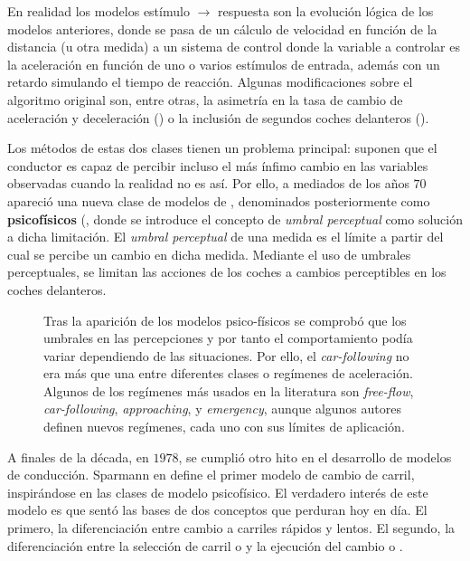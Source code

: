 En realidad los modelos estímulo $\rightarrow$ respuesta son la evolución lógica de los modelos anteriores, donde se pasa de un cálculo de velocidad en función de la distancia (u otra medida) a un sistema de control donde la variable a controlar es la aceleración en función de uno o varios estímulos de entrada, además con un retardo simulando el tiempo de reacción. Algunas modificaciones sobre el algoritmo original son, entre otras, la asimetría en la tasa de cambio de aceleración y deceleración (\cite{Gazis1959}) o la inclusión de segundos coches delanteros (\cite{Bexelius1968}).

Los métodos de estas dos clases tienen un problema principal: suponen que el conductor es capaz de percibir incluso el más ínfimo cambio en las variables observadas cuando la realidad no es así. Por ello, a mediados de los años $70$ apareció una nueva clase de modelos de \textit{}, denominados posteriormente como \textbf{psicofísicos} (\cite{wiedemann1974simulation}, donde se introduce el concepto de \textit{umbral perceptual} como solución a dicha limitación. El \textit{umbral perceptual} de una medida es el límite a partir del cual se percibe un cambio en dicha medida. Mediante el uso de umbrales perceptuales, se limitan las acciones de los coches a cambios perceptibles en los coches delanteros.

\begin{figure}
	\centering
	\caption{Tras la aparición de los modelos psico-físicos se comprobó que los umbrales en las percepciones y por tanto el comportamiento podía variar dependiendo de las situaciones. Por ello, el \textit{car-following} no era más que una entre diferentes clases o regímenes de aceleración. Algunos de los regímenes más usados en la literatura son \textit{free-flow}, \textit{car-following}, \textit{approaching}, y \textit{emergency}, aunque algunos autores definen nuevos regímenes, cada uno con sus límites de aplicación.}
	\label{fig:acceleration-model-classes}
\end{figure}

A finales de la década, en $1978$, se cumplió otro hito en el desarrollo de modelos de conducción. Sparmann en \cite{Sparmann1978} define el primer modelo de cambio de carril, inspirándose en las clases de modelo psicofísico. El verdadero interés de este modelo es que sentó las bases de dos conceptos que perduran hoy en día. El primero, la diferenciación entre cambio a carriles rápidos y lentos. El segundo, la diferenciación entre la selección de carril o \textit{} y la ejecución del cambio o \textit{}.

